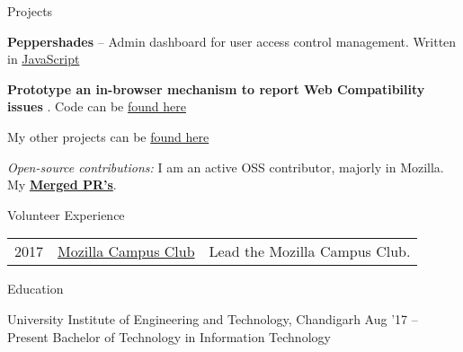 \documentclass{resume} %
\begin{document}

\begin{rSection}{Projects}
  \begin{rProjectSection}
    \item \textbf {Peppershades} -- Admin dashboard for user access control management. Written in \href{https://github.com/soniasingla/peppershades}{JavaScript}
    \item \textbf {Prototype an in-browser mechanism to report Web Compatibility issues} . Code can be \href{https://github.com/soniasingla/webcompataddon}{found here}
    \item My other projects can be \href{hhttps://soniasingla.com/#projects/}{found here}
  \end{rProjectSection}

  \begin{rBlurbSection}
    \item {\em Open-source contributions:}
      I am an active OSS contributor, majorly in Mozilla. My \href{https://bugzilla.mozilla.org/user_profile?user_id=632911}{\textbf{Merged PR's}}.
  \end{rBlurbSection}
\end{rSection}


\begin{rSection}{Volunteer Experience}
  \begin{tabular}{rll}
2017	     & {\href{https://github.com/moz-niec/}{Mozilla Campus Club}}  & Lead the Mozilla Campus Club.\\
\end{tabular}
\end{rSection}


\begin{rSection}{Education}
  \begin{rEducationSection}{University Institute of Engineering and Technology, Chandigarh}
                           {Aug '17 -- Present}
                           {Bachelor of Technology in Information Technology}
  \end{rEducationSection}
\end{rSection}
\end{document}
